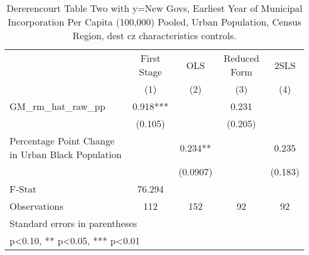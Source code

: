 \begin{table}[htbp]\centering
\def\sym#1{\ifmmode^{#1}\else\(^{#1}\)\fi}
\caption{Dererencourt Table Two with y=New Govs, Earliest Year of Municipal Incorporation Per Capita (100,000) Pooled, Urban Population, Census Region, dest cz characteristics controls.}
\begin{tabular}{l*{4}{c}}
\toprule
                    & First Stage   &         OLS   &Reduced Form   &        2SLS   \\
                    &\multicolumn{1}{c}{(1)}   &\multicolumn{1}{c}{(2)}   &\multicolumn{1}{c}{(3)}   &\multicolumn{1}{c}{(4)}   \\
\midrule
GM\_rm\_hat\_raw\_pp    &       0.918***&               &       0.231   &               \\
                    &     (0.105)   &               &     (0.205)   &               \\
\addlinespace
Percentage Point Change in Urban Black Population&               &       0.234** &               &       0.235   \\
                    &               &    (0.0907)   &               &     (0.183)   \\
\midrule
F-Stat              &      76.294   &               &               &               \\
Observations        &         112   &         152   &          92   &          92   \\
\bottomrule
\multicolumn{5}{l}{\footnotesize Standard errors in parentheses}\\
\multicolumn{5}{l}{\footnotesize * p<0.10, ** p<0.05, *** p<0.01}\\
\end{tabular}
\end{table}

